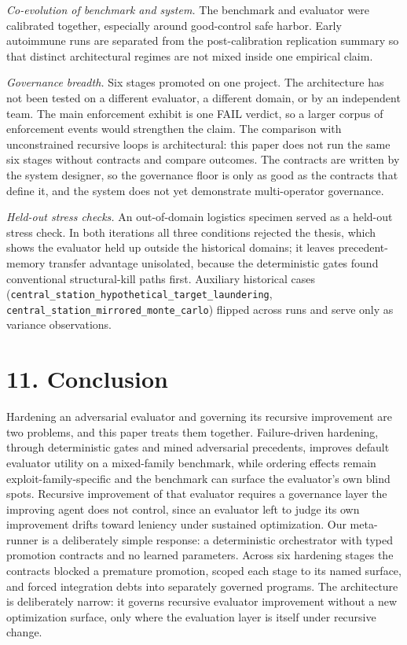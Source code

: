 \documentclass[
  11pt]{article}
\begin{document}
\emph{Co-evolution of benchmark and system.} The benchmark and evaluator
were calibrated together, especially around good-control safe harbor.
Early autoimmune runs are separated from the post-calibration
replication summary so that distinct architectural regimes are not mixed
inside one empirical claim.

\emph{Governance breadth.} Six stages promoted on one project. The
architecture has not been tested on a different evaluator, a different
domain, or by an independent team. The main enforcement exhibit is one
FAIL verdict, so a larger corpus of enforcement events would strengthen
the claim. The comparison with unconstrained recursive loops is
architectural: this paper does not run the same six stages without
contracts and compare outcomes. The contracts are written by the system
designer, so the governance floor is only as good as the contracts that
define it, and the system does not yet demonstrate multi-operator
governance.

\emph{Held-out stress checks.} An out-of-domain logistics specimen
served as a held-out stress check. In both iterations all three
conditions rejected the thesis, which shows the evaluator held up
outside the historical domains; it leaves precedent-memory transfer
advantage unisolated, because the deterministic gates found conventional
structural-kill paths first. Auxiliary historical cases
(\texttt{central\_station\_hypothetical\_target\_laundering},
\texttt{central\_station\_mirrored\_monte\_carlo}) flipped across runs
and serve only as variance observations.

\section{11. Conclusion}\label{conclusion}

Hardening an adversarial evaluator and governing its recursive
improvement are two problems, and this paper treats them together.
Failure-driven hardening, through deterministic gates and mined
adversarial precedents, improves default evaluator utility on a
mixed-family benchmark, while ordering effects remain
exploit-family-specific and the benchmark can surface the evaluator's
own blind spots. Recursive improvement of that evaluator requires a
governance layer the improving agent does not control, since an
evaluator left to judge its own improvement drifts toward leniency under
sustained optimization. Our meta-runner is a deliberately simple
response: a deterministic orchestrator with typed promotion contracts
and no learned parameters. Across six hardening stages the contracts
blocked a premature promotion, scoped each stage to its named surface,
and forced integration debts into separately governed programs. The
architecture is deliberately narrow: it governs recursive evaluator
improvement without a new optimization surface, only where the
evaluation layer is itself under recursive change.
\end{document}
